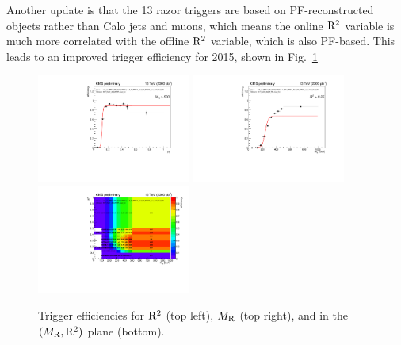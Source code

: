 Another update is that the 13 \TeV razor triggers are based on PF-reconstructed objects rather
than Calo jets and muons, which means the online $\mathrm{R}^2$ variable is
much more correlated with the offline $\mathrm{R}^2$ variable, which is also
PF-based. This leads to an improved trigger efficiency for 2015, shown in Fig.~\ref{fig:turnons}

\begin{figure}[ht!]
\centering
\includegraphics[width=0.45\textwidth]{figs/hlt13TeV/turnons_2015_no100GeVmuons/HLT_RsqMR240_Rsq0p09_MR200_HLT_RsqMR240_Rsq0p09_MR200_4jet_HLT_Rsq0p25_HLT_Ele27_eta2p1_WPLoose_Gsf_effRsq_MR500.pdf}
\includegraphics[width=0.45\textwidth]{figs/hlt13TeV/turnons_2015_no100GeVmuons/HLT_RsqMR240_Rsq0p09_MR200_HLT_RsqMR240_Rsq0p09_MR200_4jet_HLT_Rsq0p25_HLT_Ele27_eta2p1_WPLoose_Gsf_effMR_Rsq0p25.pdf}\\
\includegraphics[width=0.45\textwidth]{figs/hlt13TeV/turnons_2015_no100GeVmuons/HLT_RsqMR240_Rsq0p09_MR200_HLT_RsqMR240_Rsq0p09_MR200_4jet_HLT_Rsq0p25_HLT_Ele27_eta2p1_WPLoose_Gsf_eff2D.pdf}
\caption{\label{fig:turnons} Trigger efficiencies for $\mathrm{R}^2$ (top
  left), $M_\mathrm{R}$ (top right), and in the $(M_\mathrm{R},\mathrm{R}^2)$ plane (bottom).}
\end{figure}

